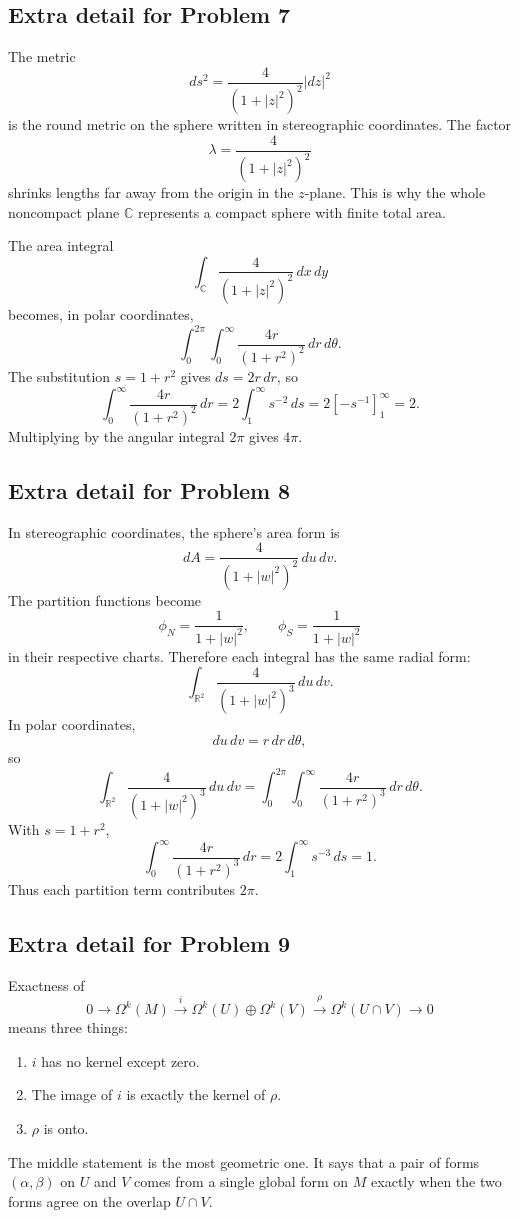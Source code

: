 \documentclass[11pt]{article}
\newcommand{\R}{\mathbb{R}}
\newcommand{\C}{\mathbb{C}}
\newcommand{\Om}{\Omega}
\begin{document}
\subsection*{Extra detail for Problem 7}

The metric
\[
 ds^2=\frac{4}{(1+|z|^2)^2}|dz|^2
\]
is the round metric on the sphere written in stereographic coordinates. The factor
\[
 \lambda=\frac{4}{(1+|z|^2)^2}
\]
shrinks lengths far away from the origin in the $z$-plane. This is why the whole noncompact plane $\C$ represents a compact sphere with finite total area.

The area integral
\[
 \int_{\C}\frac{4}{(1+|z|^2)^2}\,dx\,dy
\]
becomes, in polar coordinates,
\[
 \int_0^{2\pi}\int_0^\infty\frac{4r}{(1+r^2)^2}\,dr\,d\theta.
\]
The substitution $s=1+r^2$ gives $ds=2r\,dr$, so
\[
 \int_0^\infty\frac{4r}{(1+r^2)^2}\,dr
 =
 2\int_1^\infty s^{-2}\,ds
 =
 2\left[-s^{-1}\right]_1^\infty
 =
 2.
\]
Multiplying by the angular integral $2\pi$ gives $4\pi$.

\subsection*{Extra detail for Problem 8}

In stereographic coordinates, the sphere's area form is
\[
 dA=\frac{4}{(1+|w|^2)^2}\,du\,dv.
\]
The partition functions become
\[
 \phi_N=\frac{1}{1+|w|^2},
 \qquad
 \phi_S=\frac{1}{1+|w|^2}
\]
in their respective charts. Therefore each integral has the same radial form:
\[
 \int_{\R^2}\frac{4}{(1+|w|^2)^3}\,du\,dv.
\]
In polar coordinates,
\[
 du\,dv=r\,dr\,d\theta,
\]
so
\[
 \int_{\R^2}\frac{4}{(1+|w|^2)^3}\,du\,dv
 =
 \int_0^{2\pi}\int_0^\infty\frac{4r}{(1+r^2)^3}\,dr\,d\theta.
\]
With $s=1+r^2$,
\[
 \int_0^\infty\frac{4r}{(1+r^2)^3}\,dr
 =
 2\int_1^\infty s^{-3}\,ds
 =
 1.
\]
Thus each partition term contributes $2\pi$.

\subsection*{Extra detail for Problem 9}

Exactness of
\[
 0\to\Om^k(M)\xrightarrow{i}\Om^k(U)\oplus\Om^k(V)\xrightarrow{\rho}\Om^k(U\cap V)\to0
\]
means three things:
\begin{enumerate}
\item $i$ has no kernel except zero.
\item The image of $i$ is exactly the kernel of $\rho$.
\item $\rho$ is onto.
\end{enumerate}
The middle statement is the most geometric one. It says that a pair of forms $(\alpha,\beta)$ on $U$ and $V$ comes from a single global form on $M$ exactly when the two forms agree on the overlap $U\cap V$.
\end{document}
